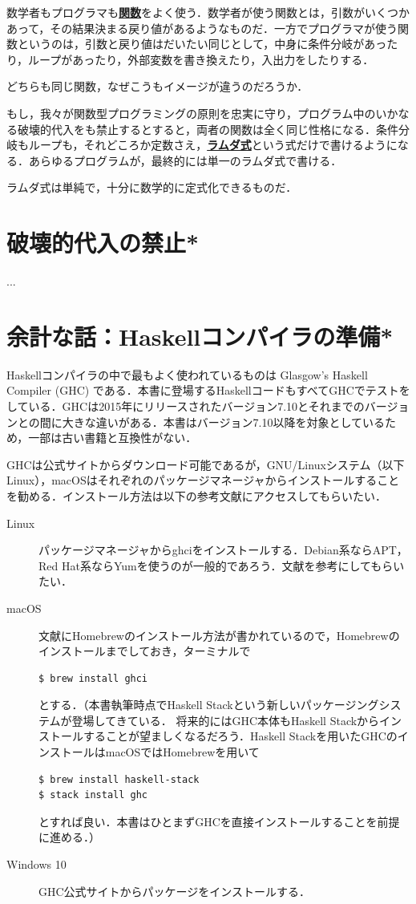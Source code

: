 \documentclass[a4paper,twocolumn]{jsbook}
\newcommand{\programminglanguage}[1]{\textsf{#1}}
\newcommand{\haskell}{\programminglanguage{Haskell}}
\newcommand{\keyword}[1]{{\underline{\textbf{#1}}}}
\begin{document}
数学者もプログラマも\keyword{関数}をよく使う．数学者が使う関数とは，引数がいくつかあって，その結果決まる戻り値があるようなものだ．一方でプログラマが使う関数というのは，引数と戻り値はだいたい同じとして，中身に条件分岐があったり，ループがあったり，外部変数を書き換えたり，入出力をしたりする．

どちらも同じ関数，なぜこうもイメージが違うのだろうか．

もし，我々が関数型プログラミングの原則を忠実に守り，プログラム中のいかなる破壊的代入をも禁止するとすると，両者の関数は全く同じ性格になる．条件分岐もループも，それどころか定数さえ，\keyword{ラムダ式}という式だけで書けるようになる．あらゆるプログラムが，最終的には単一のラムダ式で書ける．

ラムダ式は単純で，十分に数学的に定式化できるものだ．

\section{破壊的代入の禁止*}

...

\section{余計な話：\haskell コンパイラの準備*}

\haskell コンパイラの中で最もよく使われているものは Glasgow's Haskell Compiler (GHC) である．本書に登場する\haskell コードもすべてGHCでテストをしている．GHCは2015年にリリースされたバージョン7.10とそれまでのバージョンとの間に大きな違いがある．本書はバージョン7.10以降を対象としているため，一部は古い書籍と互換性がない．

GHCは公式サイト\cite{haskellplatform}からダウンロード可能であるが，GNU/Linuxシステム（以下Linux），macOSはそれぞれのパッケージマネージャからインストールすることを勧める．インストール方法は以下の参考文献にアクセスしてもらいたい．
\begin{description}
\item[Linux] パッケージマネージャからghciをインストールする．Debian系ならAPT，Red Hat系ならYumを使うのが一般的であろう．文献\cite{linux}を参考にしてもらいたい．
\item[macOS] 文献\cite{osx}にHomebrewのインストール方法が書かれているので，Homebrewのインストールまでしておき，ターミナルで
\begin{verbatim}
$ brew install ghci
\end{verbatim} %
とする．（本書執筆時点でHaskell Stackという新しいパッケージングシステムが登場してきている．
将来的にはGHC本体もHaskell Stackからインストールすることが望ましくなるだろう．Haskell Stackを用いたGHCのインストールはmacOSではHomebrewを用いて
\begin{verbatim}
$ brew install haskell-stack
$ stack install ghc
\end{verbatim} %
とすれば良い．本書はひとまずGHCを直接インストールすることを前提に進める．）
\item[Windows 10] GHC公式サイト\cite{haskellplatform}からパッケージをインストールする．
\end{description}
\end{document}
